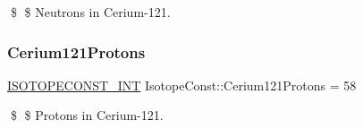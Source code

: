 \$ \$ Neutrons in Cerium-\/121. \mbox{\label{group___isotope_const-_cerium-_ce121_gae9ca5a70e062b884018d79596db58c7a}} 
\subsubsection{\texorpdfstring{Cerium121\+Protons}{Cerium121Protons}}
{\footnotesize\ttfamily \mbox{\hyperlink{group___isotope_const-_macros_ga5f18360b3e99483a35c32d789e62621c}{I\+S\+O\+T\+O\+P\+E\+C\+O\+N\+S\+T\+\_\+\+I\+NT}} Isotope\+Const\+::\+Cerium121\+Protons = 58}

\$ \$ Protons in Cerium-\/121. 